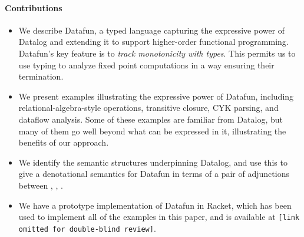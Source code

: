 \paragraph{Contributions}
\begin{itemize}
\item We describe Datafun, a typed language capturing the expressive power of
  Datalog and extending it to support higher-order functional programming.
  Datafun's key feature is to \emph{track monotonicity with types}. This permits
  us to use typing to analyze fixed point computations in a way ensuring their
  termination.

\item We present examples illustrating the expressive power of Datafun,
  including relational-algebra-style operations, transitive closure, CYK
  parsing, and dataflow analysis. Some of these examples are familiar from
  Datalog, but many of them go well beyond what can be expressed in it,
  illustrating the benefits of our approach.

\item We identify the semantic structures underpinning Datalog, and
  use this to give a denotational semantics for Datafun in terms of a
  pair of adjunctions between \cSet{}, \cPoset{}, \cSL{}.

\item We have a prototype implementation of Datafun in Racket, which
  has been used to implement all of the examples in this paper, and is
  available at \texttt{[link omitted for double-blind review]}. 
\end{itemize}







